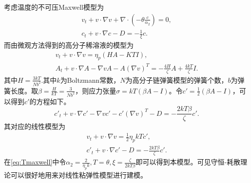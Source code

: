 \documentclass{article}
\begin{document}
	考虑温度的不可压Maxwell模型为
	\begin{eqnarray} \label{eq:Tmaxwell}
		v_t + v \cdot \nabla v + \nabla \cdot (-\theta \frac{c}{\alpha_2}) = 0, \\
		c_t + v \cdot \nabla c - D = -\frac{1}{\xi} c.
	\end{eqnarray}
	而由微观方法得到的高分子稀溶液的模型为 \cite{}
	\begin{eqnarray*}
		v_t + v \cdot \nabla v = \eta_p (H A - KT I), \\
		A_t + v \cdot \nabla A - \nabla v A - A(\nabla v)^T  = -\frac{4 H}{\zeta} A+ \frac{4kT}{\zeta} I.
	\end{eqnarray*}
	其中$H = \frac{3kT}{Nb^2}$.其中$k$为Boltzmann常数，$N$为高分子链弹簧模型的弹簧个数，$b$为弹簧长度。取$\beta = \frac{H}{kT} = \frac{3}{Nb^2}$，则应力张量$\sigma = k T(\beta A-I)$。令$c'=\frac{1}{2}(\beta A-I)$，可以得到$c'$的方程如下。
	\begin{equation*}
		c'_t + v \cdot \nabla c'- \nabla v c' - c'(\nabla v)^T -  D  = -\frac{2 kT \beta}{\zeta} c'.
	\end{equation*}
	其对应的线性模型为
	\begin{eqnarray*}
		v_t + v \cdot \nabla v = \frac{1}{2} \eta_p kT c', \\
		c'_t + v \cdot \nabla c' -  D  = -\frac{2 kT \beta}{\zeta} c'.
	\end{eqnarray*}
	在\eqref{eq:Tmaxwell}中令$\alpha_2 = \frac{2}{\eta_p k}, T = \theta,\xi = \frac{\zeta}{2 kT \beta}$即可以得到本模型。可见守恒-耗散理论可以很好地用来对线性粘弹性模型进行建模。
\end{document}

